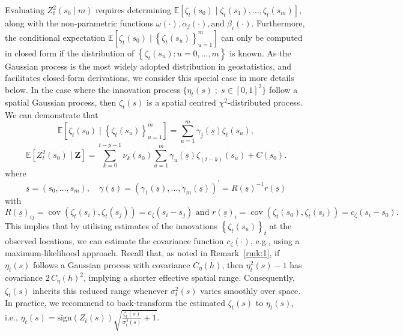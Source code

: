 \documentclass[fleqn,11pt]{article}
\begin{document}
Evaluating  $Z_t^2\left(s_0 \mid m\right)$ requires determining   $\mathbb{E}\left[\zeta_t\left(s_0\right) \mid \zeta_t\left(s_1\right), \ldots, \zeta_t\left(s_m\right)\right]$, along with the non-parametric functions  $\omega(\cdot), \alpha_j(\cdot), \text{and} \; \beta_i(\cdot)$. Furthermore, the conditional expectation \linebreak $\mathbb{E}\left[\zeta_t\left(s_0\right) \mid\left\{\zeta_t\left(s_u\right)\right\}_{u=1}^m\right]$ can only be computed in closed form if the distribution of \linebreak $\left\{\zeta_t\left(s_u\right): u=0, \ldots, m\right\}$ is known. As the Gaussian process is the most widely adopted distribution in geostatistics, and facilitates closed-form derivations, we consider this special case in more details below. In the case where the innovation process $\{\eta_t(s) \; ;  \;  s \in[0,1]^2 \}$ follow a spatial Gaussian process, then $\zeta_t(s)$ is a spatial centred $\chi^2$-distributed process. We can demonstrate that 
$$
\mathbb{E}\left[\zeta_t\left(s_0\right) \mid\left\{\zeta_t\left(s_u\right)\right\}_{u=1}^m\right]=\sum_{u=1}^m \gamma_j(\underline{s}) \zeta_t\left(s_u\right),
$$
$$  \mathbb{E}\left[Z_t^2\left(s_0\right) \mid \mathbf{Z}\right]   =\sum_{k=0}^{t-p-1} \nu_k\left(s_0\right) \sum_{u=1}^m \gamma_u(\underline{s}) \zeta_{(t-k)}\left(s_u\right) + C(s_0).$$
where
$$
\underline{s}=\left(s_0, \ldots, s_m\right), \quad \gamma(\underline{s})=\left(\gamma_1(\underline{s}), \ldots, \gamma_m(\underline{s})\right)^{\prime}=R(\underline{s})^{-1} r(\underline{s})
$$
with
$$
R(\underline{s})_{i j}=\operatorname{cov}\left(\zeta_t\left(s_i\right), \zeta_t\left(s_j\right)\right)=c_{\zeta}\left(s_i-s_j\right) \text { and } r(\underline{s})_i=\operatorname{cov}\left(\zeta_t\left(s_0\right), \zeta_t\left(s_i\right)\right)=c_{\zeta}\left(s_i-s_0\right) \text {.}
$$
This implies that by utilising estimates of the innovations $\left\{\zeta_t\left(s_u\right)\right\}_t$ at the observed locations, we can estimate the covariance function $c_{\zeta}\left(\cdot\right)$, e.g., using a maximum-likelihood approach. Recall that, as noted in Remark~\ref{rmk:1}, if $\eta_t(s)$ follows a Gaussian process with covariance $C_{\eta}(h)$, then $\eta_t^2(s)-1$ has covariance $2\,C_{\eta}(h)^2$, implying a shorter effective spatial range. Consequently, $\zeta_t(s)$ inherits this reduced range whenever $\sigma_t^2(s)$ varies smoothly over space. In practice, we recommend to back-transform the estimated $\zeta_t(s)$ to $\eta_t(s)$, i.e., $\eta_t(s) = \text{sign}(Z_t(s))\sqrt{\frac{\zeta_t(s)}{\sigma_t^2(s)} + 1}$.
\end{document}
